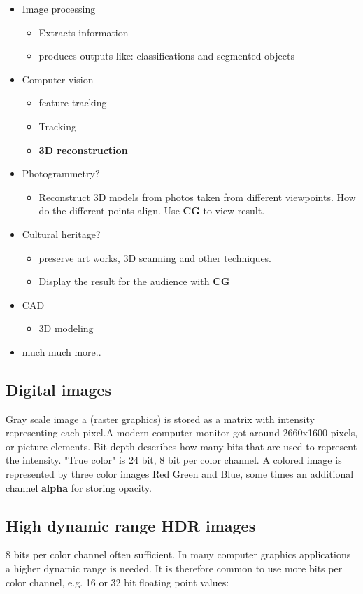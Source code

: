 \begin{itemize}
\begin{itemize}
	\end{itemize}
	\item Image processing
	\begin{itemize}
		\item Extracts information
		\item produces outputs like: classifications and segmented objects
	\end{itemize}
	\item Computer vision
	\begin{itemize}
		\item feature tracking
		\item Tracking
		\item \textbf{3D reconstruction}
	\end{itemize}
	\item Photogrammetry?
	\begin{itemize}
		\item Reconstruct 3D models from photos taken from different viewpoints. How do the different points align. Use \textbf{CG} to view result. 
	\end{itemize}
	\item Cultural heritage?
	\begin{itemize}
		\item preserve art works, 3D scanning and other techniques. 
		\item Display the result for the audience with \textbf{CG}
	\end{itemize}
	\item CAD
	\begin{itemize}
		\item 3D modeling
	\end{itemize}
	\item much much more..
\end{itemize}

\subsection*{Digital images}
Gray scale image a (raster graphics) is stored as a matrix with intensity representing each pixel.A modern computer monitor got around 2660x1600 pixels, or picture elements. Bit depth describes how many bits that are used to represent the intensity. "True color" is 24 bit, 8 bit per color channel. A colored image is represented by three color images Red Green and Blue, some times an additional channel \textbf{alpha} for storing opacity. 

\subsection*{High dynamic range \textbf{HDR} images}
8 bits per color channel often sufficient. In many computer graphics applications a higher dynamic range is needed. It is therefore common to use more bits per color channel, e.g. 16 or 32 bit floating point values: 

